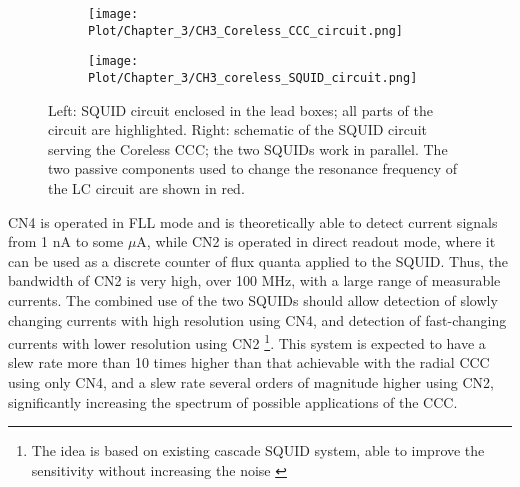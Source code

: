 \documentclass[12pt,a4paper]{report}
\begin{document}
       \begin{figure}[H]
       	\begin{subfigure}[b]{0.45\textwidth}
       		\centering
       		\texttt{[image: Plot/Chapter\_3/CH3\_Coreless\_CCC\_circuit.png]}
       	\end{subfigure}
       	\hfill
       	\begin{subfigure}[b]{0.6\textwidth}
       		\centering
       		\texttt{[image: Plot/Chapter\_3/CH3\_coreless\_SQUID\_circuit.png]}
       	\end{subfigure}
       	\caption{\small{Left: SQUID circuit enclosed in the lead boxes; all parts of the circuit are highlighted. Right: schematic of the SQUID circuit serving the Coreless CCC; the two SQUIDs work in parallel. The two passive components used to change the resonance frequency of the LC circuit are shown in red.}}
       	\label{CH3_coreless_circuit}
       \end{figure}
       CN4 is operated in FLL mode and is theoretically able to detect current signals from 1 nA to some $\mu$A, while CN2 is operated in direct readout mode, where it can be used as a discrete counter of flux quanta applied to the SQUID. Thus, the bandwidth of CN2 is very high, over 100 MHz, with a large range of measurable currents. The combined use of the two SQUIDs should allow detection of slowly changing currents with high resolution using CN4, and detection of fast-changing currents with lower resolution using CN2 \footnote{The idea is based on existing cascade SQUID system, able to improve the sensitivity without increasing the noise \cite{Cascade_squid}}. This system is expected to have a slew rate more than 10 times higher than that achievable with the radial CCC using only CN4, and a slew rate several orders of magnitude higher using CN2, significantly increasing the spectrum of possible applications of the CCC.
       
\end{document}

